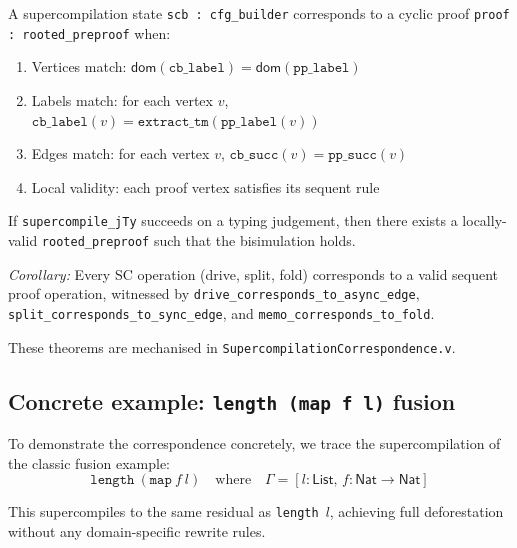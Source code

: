\begin{theorem}
A supercompilation state \texttt{scb : cfg\_builder} corresponds to a cyclic proof \texttt{proof : rooted\_preproof} when:
\begin{enumerate}[leftmargin=*]
\item Vertices match: $\mathsf{dom}(\texttt{cb\_label}) = \mathsf{dom}(\texttt{pp\_label})$
\item Labels match: for each vertex $v$, $\texttt{cb\_label}(v) = \texttt{extract\_tm}(\texttt{pp\_label}(v))$
\item Edges match: for each vertex $v$, $\texttt{cb\_succ}(v) = \texttt{pp\_succ}(v)$
\item Local validity: each proof vertex satisfies its sequent rule
\end{enumerate}
\end{theorem}

\begin{theorem}
If \texttt{supercompile\_jTy} succeeds on a typing judgement, then there exists a locally-valid \texttt{rooted\_preproof} such that the bisimulation holds.

\emph{Corollary:} Every SC operation (drive, split, fold) corresponds to a valid sequent proof operation, witnessed by \texttt{drive\_corresponds\_to\_async\_edge}, \texttt{split\_corresponds\_to\_sync\_edge}, and \texttt{memo\_corresponds\_to\_fold}.
\end{theorem}

These theorems are mechanised in \texttt{SupercompilationCorrespondence.v}.

\subsection{Concrete example: \texttt{length (map f l)} fusion}
To demonstrate the correspondence concretely, we trace the supercompilation of the classic fusion example:
\[
\texttt{length}~(\texttt{map}~f~l) \quad\text{where}\quad \Gamma = [l : \mathsf{List},\, f : \mathsf{Nat} \to \mathsf{Nat}]
\]

This supercompiles to the same residual as \texttt{length}~$l$, achieving full deforestation without any domain-specific rewrite rules.

